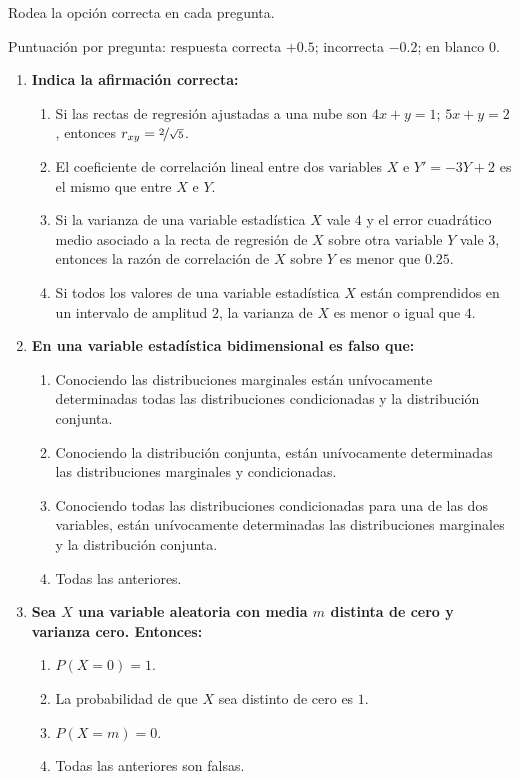 \documentclass[12pt]{article}
\begin{document}
    \begin{ejercicio}[3 puntos]
        Rodea la opción correcta en cada pregunta.
        
        Puntuación por pregunta: respuesta correcta $+0.5$; incorrecta $-0.2$; en blanco $0$.
        
        \begin{enumerate}[label=\arabic*.]
            \item \textbf{Indica la afirmación correcta:}
            \begin{enumerate}[label=\alph*)]
                \item Si las rectas de regresión ajustadas a una nube son $4x+y=1$; $5x+y=2$, entonces $r_{xy} = \nicefrac{2}{\sqrt{5}}$.
                \item El coeficiente de correlación lineal entre dos variables $X$ e $Y'=-3Y+2$ es el mismo que entre $X$ e $Y$.
                \item Si la varianza de una variable estadística $X$ vale $4$ y el error cuadrático medio asociado a la recta de regresión de $X$ sobre otra variable $Y$ vale $3$, entonces la razón de correlación de $X$ sobre $Y$ es menor que $0.25$.
                \item Si todos los valores de una variable estadística $X$ están comprendidos en un intervalo de amplitud $2$, la varianza de $X$ es menor o igual que $4$.
            \end{enumerate}
            
            \item \textbf{En una variable estadística bidimensional es falso que:}
            \begin{enumerate}[label=\alph*)]
                \item Conociendo las distribuciones marginales están unívocamente determinadas todas las distribuciones condicionadas y la distribución conjunta.
                \item Conociendo la distribución conjunta, están unívocamente determinadas las distribuciones marginales y condicionadas.
                \item Conociendo todas las distribuciones condicionadas para una de las dos variables, están unívocamente determinadas las distribuciones marginales y la distribución conjunta.
                \item Todas las anteriores.
            \end{enumerate}
            
            \item \textbf{Sea $X$ una variable aleatoria con media $m$ distinta de cero y varianza cero. Entonces:}
            \begin{enumerate}[label=\alph*)]
                \item $P(X=0)=1$.
                \item La probabilidad de que $X$ sea distinto de cero es $1$.
                \item $P(X=m)=0$.
                \item Todas las anteriores son falsas.
            \end{enumerate}
            

\end{enumerate}
\end{ejercicio}
\end{document}
